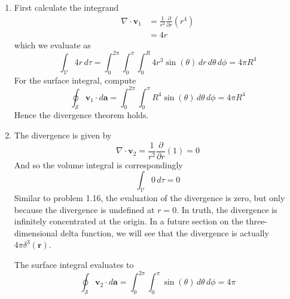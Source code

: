 \documentclass[a4paper]{article}
\begin{document}

\begin{enumerate}[label=(\alph*)]
	\item First calculate the integrand
	\begin{align*}
		\nabla \cdot \pmb{v}_{1} & = \frac{1}{r^{2}}\frac{\partial }{\partial r}\!\left( r^{4} \right) \\
		 & = 4r
	\end{align*}
	which we evaluate as 
	\[
		\int_{\mathcal{V}} 4r \, d \tau = \int^{2 \pi}_{0} \int^{\pi}_{0} \int^{R}_{0} 4r^{3}\sin\!\left(\theta\right) \, dr \, d \theta \, d \phi = 4 \pi R^{4}
	\]
	For the surface integral, compute
	\[
		\oint_{\mathcal{S}}\pmb{v}_{1} \cdot d \pmb{a} = \int^{2 \pi}_{0} \int^{\pi}_{0} R^{4}\sin\!\left(\theta\right) \, d \theta \, d \phi = 4 \pi R^{4}
	\]
	Hence the divergence theorem holds.
	\item The divergence is given by
	\[
		\nabla \cdot \pmb{v}_{2} = \frac{1}{r^{2}}\frac{\partial }{\partial r}\!\left( 1 \right) = 0
	\]
	And so the volume integral is correspondingly
	\[
		\int_{\mathcal{V}} 0 \, d \tau = 0
	\]
	Similar to problem 1.16, the evaluation of the divergence is zero, but only because the divergence is undefined at \( r = 0 \). In truth, the divergence is infinitely concentrated at the origin. In a future section on the three-dimensional delta function, we will see that the divergence is actually \( 4 \pi \delta^{3}\!\left( \pmb{r} \right) \).

	The surface integral evaluates to
	\[
		\oint_{\mathcal{S}}\pmb{v}_{2} \cdot d \pmb{a} = \int^{2 \pi}_{0} \int^{\pi}_{0} \sin\!\left(\theta\right) \, d \theta \, d \phi = 4 \pi
	\]
\end{enumerate}
\end{document}
